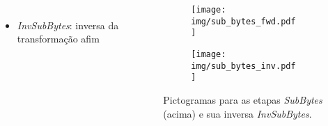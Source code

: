 \documentclass[12pt]{beamer}
\begin{document}
\begin{frame}
\begin{columns}[T]
\begin{column}{.7\textwidth}
\begin{itemize}
\begin{equation*}
\begin{smallmatrix}
                        \end{smallmatrix}
                    \end{equation*}
                \item \emph{InvSubBytes}: inversa da transformação afim
            \end{itemize}
        \end{column}
        \begin{column}{.25\textwidth}
            \begin{figure}
            \centering
            \begin{subfigure}[b]{0.7\textwidth}
               \texttt{[image: img/sub\_bytes\_fwd.pdf]}
               \vspace{2mm}
            \end{subfigure}
            
            \begin{subfigure}[b]{0.7\textwidth}
               \texttt{[image: img/sub\_bytes\_inv.pdf]}
            \end{subfigure}
                    \captionsetup{font=scriptsize}
        
            \caption*{Pictogramas para as etapas \emph{SubBytes} (acima) e sua inversa \emph{InvSubBytes}.}
            \end{figure}
        \end{column}
    \end{columns}
\end{frame}
\end{document}
